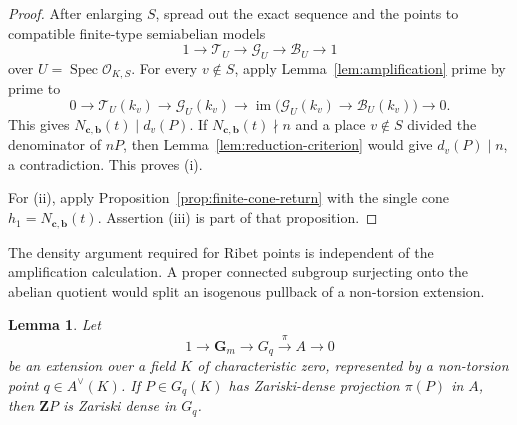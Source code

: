 \documentclass[11pt,letterpaper,reqno]{amsart}
\newtheorem{lemma}[theorem]{Lemma}
\theoremstyle{definition}
\theoremstyle{remark}
\newcommand{\Gm}{\mathbf G_m}
\newcommand{\Spec}{\operatorname{Spec}}
\newcommand{\im}{\operatorname{im}}
\newcommand{\cO}{\mathcal O}
\begin{document}
\begin{proof}
After enlarging $S$, spread out the exact sequence and the points to compatible
finite-type semiabelian models
\[
 1\longrightarrow\mathcal T_U\longrightarrow\mathcal G_U
 \longrightarrow\mathcal B_U\longrightarrow1
\]
over $U=\Spec\cO_{K,S}$.  For every $v\notin S$, apply
Lemma~\ref{lem:amplification} prime by prime to
\[
 0\longrightarrow\mathcal T_U(k_v)\longrightarrow\mathcal G_U(k_v)
 \longrightarrow
 \im\bigl(\mathcal G_U(k_v)\to\mathcal B_U(k_v)\bigr)
 \longrightarrow0.
\]
This gives $N_{\mathbf c,\mathbf b}(t)\mid d_v(P)$.  If
$N_{\mathbf c,\mathbf b}(t)\nmid n$ and a place $v\notin S$ divided the
denominator of $nP$, then Lemma~\ref{lem:reduction-criterion} would give
$d_v(P)\mid n$, a contradiction.  This proves (i).

For (ii), apply Proposition~\ref{prop:finite-cone-return} with the single cone
$h_1=N_{\mathbf c,\mathbf b}(t)$.  Assertion (iii) is part of that
proposition.
\end{proof}

The density argument required for Ribet points is independent of the
amplification calculation.  A proper connected subgroup surjecting onto the
abelian quotient would split an isogenous pullback of a non-torsion
extension.

\begin{lemma}
\label{lem:dense-lift}
Let
\[
 1\longrightarrow\Gm\longrightarrow G_q\xrightarrow{\pi}A\longrightarrow0
\]
be an extension over a field $K$ of characteristic zero, represented by a
non-torsion point $q\in A^\vee(K)$.  If $P\in G_q(K)$ has Zariski-dense
projection $\pi(P)$ in $A$, then $\mathbf ZP$ is Zariski dense in $G_q$.
\end{lemma}
\end{document}
